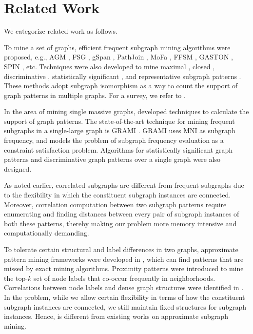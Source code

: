 \vspace{-0.10in}
\section{Related Work}
\label{sec:related}
%
We categorize related work as follows.

To mine a set of graphs, efficient frequent subgraph mining algorithms were proposed,
e.g., AGM \cite{IWM00}, FSG \cite{KK01}, gSpan \cite{YH02}, PathJoin \cite{VGS02}, MoFa \cite{BB02},
FFSM \cite{HWP03}, GASTON \cite{NK04}, SPIN \cite{HWPY04}, etc. Techniques were also developed
to mine maximal \cite{HWPY04,MMF10}, closed \cite{YH03}, discriminative \cite{YCHY08,RHS13},
statistically significant \cite{HasanZ09,JinYW10}, and representative subgraph patterns \cite{HasanCSBZ07,ZYL09}.
These methods adopt subgraph isomorphism as a way to count the support of graph patterns in multiple graphs. 
For a survey, we refer to \cite{KhanR17,CYH10}.

In the area of mining single massive graphs, \cite{KK04,ChenHLN06,FB07,BN08} developed techniques to calculate the support of graph patterns. 
The state-of-the-art technique for mining frequent subgraphs
in a single-large graph is GRAMI \cite{EASK14}. GRAMI uses MNI \cite{BN08} as subgraph frequency, and models the problem of
subgraph frequency evaluation as a constraint satisfaction problem. Algorithms for statistically significant graph patterns \cite{AroraSB14}
and discriminative graph patterns \cite{DangSBYH14,DangYBS15} over a single graph were also designed.

As noted earlier, correlated subgraphs are different from frequent subgraphs due to the
flexibility in which the constituent subgraph instances are connected. Moreover,
correlation computation between two subgraph patterns require enumerating
and finding distances between every pair of subgraph instances of
both these patterns, thereby making our problem more
memory intensive and computationally demanding.

\vspace{-0.05in}
To tolerate certain structural and label differences in two graphs,
approximate pattern mining frameworks were developed in \cite{MendozaAM12,ChenYZH07,AnchuriZBGS13},
which can find patterns that are missed by exact mining algorithms. 
Proximity patterns \cite{KYW10} were introduced to mine the top-$k$ set of node labels that co-occur frequently
in neighborhoods. Correlations between node labels and dense graph structures were identified in
\cite{GWZSY11,SMZ12}. In the {} problem, while we allow certain flexibility in terms of how the
constituent subgraph instances are connected, we still maintain fixed structures for subgraph instances.
Hence, {} is different from existing works on approximate subgraph mining.


